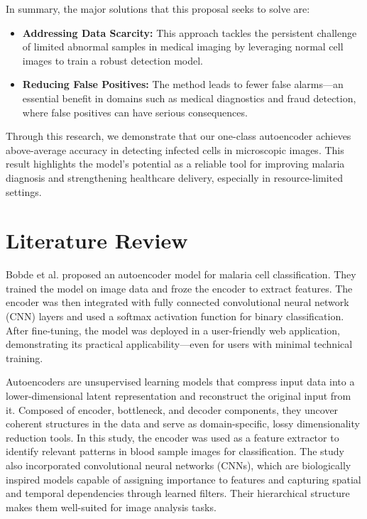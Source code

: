\documentclass[journal,12pt,onecolumn,draftcls]{IEEEtran}
\begin{document}
In summary, the major solutions that this proposal seeks to solve are:
\begin{itemize}
  \item \textbf{Addressing Data Scarcity:} This approach tackles the persistent challenge of limited abnormal samples in medical imaging by leveraging normal cell images to train a robust detection model.
  \item \textbf{Reducing False Positives:} The method leads to fewer false alarms—an essential benefit in domains such as medical diagnostics and fraud detection, where false positives can have serious consequences.
\end{itemize}

Through this research, we demonstrate that our one-class autoencoder achieves above-average accuracy in detecting infected cells in microscopic images. This result highlights the model’s potential as a reliable tool for improving malaria diagnosis and strengthening healthcare delivery, especially in resource-limited settings.

\section{Literature Review}
Bobde et al. \cite{bobde2022} proposed an autoencoder model for malaria cell classification. They trained the model on image data and froze the encoder to extract features. The encoder was then integrated with fully connected convolutional neural network (CNN) layers and used a softmax activation function for binary classification. After fine-tuning, the model was deployed in a user-friendly web application, demonstrating its practical applicability—even for users with minimal technical training.

Autoencoders are unsupervised learning models that compress input data into a lower-dimensional latent representation and reconstruct the original input from it. Composed of encoder, bottleneck, and decoder components, they uncover coherent structures in the data and serve as domain-specific, lossy dimensionality reduction tools. In this study, the encoder was used as a feature extractor to identify relevant patterns in blood sample images for classification. The study also incorporated convolutional neural networks (CNNs), which are biologically inspired models capable of assigning importance to features and capturing spatial and temporal dependencies through learned filters. Their hierarchical structure makes them well-suited for image analysis tasks.
\end{document}
